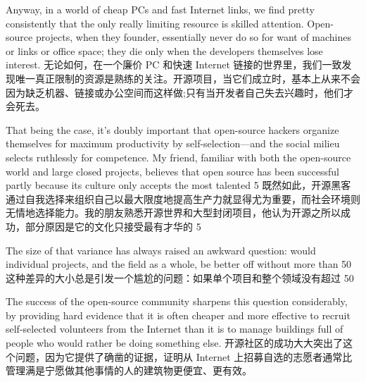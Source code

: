 \documentclass[a4paper,12pt,UTF8,twoside]{ctexbook}
\begin{document}
Anyway, in a world of cheap PCs and fast Internet links, we find pretty consistently that the only really limiting resource is skilled attention. Open-source projects, when they founder, essentially never do so for want of machines or links or office space; they die only when the developers themselves lose interest.
无论如何，在一个廉价 PC 和快速 Internet 链接的世界里，我们一致发现唯一真正限制的资源是熟练的关注。开源项目，当它们成立时，基本上从来不会因为缺乏机器、链接或办公空间而这样做;只有当开发者自己失去兴趣时，他们才会死去。

That being the case, it's doubly important that open-source hackers organize themselves for maximum productivity by self-selection—and the social milieu selects ruthlessly for competence. My friend, familiar with both the open-source world and large closed projects, believes that open source has been successful partly because its culture only accepts the most talented 5%
既然如此，开源黑客通过自我选择来组织自己以最大限度地提高生产力就显得尤为重要，而社会环境则无情地选择能力。我的朋友熟悉开源世界和大型封闭项目，他认为开源之所以成功，部分原因是它的文化只接受最有才华的 5%

The size of that variance has always raised an awkward question: would individual projects, and the field as a whole, be better off without more than 50%
这种差异的大小总是引发一个尴尬的问题：如果单个项目和整个领域没有超过 50%

The success of the open-source community sharpens this question considerably, by providing hard evidence that it is often cheaper and more effective to recruit self-selected volunteers from the Internet than it is to manage buildings full of people who would rather be doing something else.
开源社区的成功大大突出了这个问题，因为它提供了确凿的证据，证明从 Internet 上招募自选的志愿者通常比管理满是宁愿做其他事情的人的建筑物更便宜、更有效。
\end{document}
